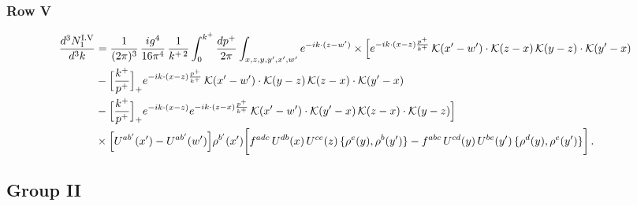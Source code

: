 \documentclass[9pt]{article}
\numberwithin{equation}{section}
\begin{document}
\subsubsection*{Row V}
\begin{align}
\frac{d^{3}N^{\rm I.V}_{1}}{d^{3}k} & =\frac{1}{(2\pi)^{3}}\,\frac{ig^{4}}{16\pi^{4}}\,\frac{1}{k^{+\,2}}\int_{0}^{k^{+}}\frac{dp^{+}}{2\pi}\int_{x,z,y,y',x',w'}e^{-ik\cdot(z-w')}\times\Big[e^{-ik\cdot(x-z)\frac{p^{+}}{k^{+}}}\,\mathcal{K}(x'-w')\cdot\mathcal{K}(z-x)\,\mathcal{K}(y-z)\cdot\mathcal{K}(y'-x)\notag\\
&-\Big[\frac{k^{+}}{p^{+}}\Big]_{+}e^{-ik\cdot(x-z)\frac{p^{+}}{k^{+}}}\,\mathcal{K}(x'-w')\cdot\mathcal{K}(y-z)\,\mathcal{K}(z-x)\cdot\mathcal{K}(y'-x)\notag\\
&-\Big[\frac{k^{+}}{p^{+}}\Big]_{+}e^{-ik\cdot(x-z)}e^{-ik\cdot(z-x)\frac{p^{+}}{k^{+}}}\,\mathcal{K}(x'-w')\cdot\mathcal{K}(y'-x)\,\mathcal{K}(z-x)\cdot\mathcal{K}(y-z)\Big]\notag\\
&\times\Big[U^{ab'}(x')-U^{ab'}(w')\Big]\rho^{b'}(x')\bigg[f^{adc}\,U^{db}(x)\,U^{ce}(z)\,\{\rho^{e}(y),\rho^{b}(y')\}-f^{abc}\,U^{cd}(y)\,U^{be}(y')\,\{\rho^{d}(y),\rho^{e}(y')\}\bigg]\,.\label{eq:B-I5}
\end{align}
\subsection{Group II}
\end{document}

